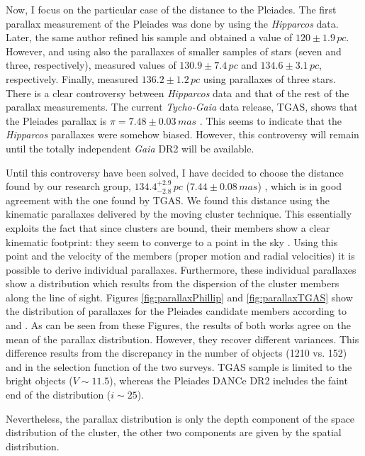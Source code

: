 Now, I focus on the particular case of the distance to the Pleiades. The first parallax measurement of the Pleiades was done by \citet{1999A&A...341L..71V} using the \emph{Hipparcos} data. Later, the same author \citep{2009A&A...497..209V} refined his sample and obtained a value of $120\pm1.9\,pc$. However, \citet{2000ApJ...533..938G} and \citet{2005AJ....129.1616S} using also the parallaxes of smaller samples of stars (seven and three, respectively), measured values of $130.9\pm7.4\,pc$ and $134.6\pm3.1\,pc$, respectively. Finally, \citet{2014Sci...345.1029M} measured $136.2\pm1.2\,pc$ using parallaxes of three stars. There is a clear controversy between \emph{Hipparcos} data and that of the rest of the parallax measurements. The current \emph{Tycho-Gaia} data release, TGAS, shows that the Pleiades parallax is $\pi = 7.48\pm0.03\,mas$ \citep{2017A&A...601A..19G}. This seems to indicate that the \emph{Hipparcos} parallaxes were somehow biased. However, this controversy will remain until the totally independent \emph{Gaia} DR2 will be available.

Until this controversy have been solved, I have decided to choose the distance found by our research group, $134.4^{+2.9}_{-2.8}\,pc$ ($7.44\pm0.08\,mas$) \citep{Galli2017}, which is in good agreement with the one found by TGAS. We found this distance using the kinematic parallaxes delivered by the moving cluster technique. This essentially exploits the fact that since clusters are bound, their members show a clear kinematic footprint: they seem to converge to a point in the sky \citep{1964IAUS...20...50B}. Using this point and the velocity of the members (proper motion and radial velocities) it is possible to derive individual parallaxes. Furthermore, these individual parallaxes show a distribution which results from the dispersion of the cluster members along the line of sight. Figures \ref{fig:parallaxPhillip} and \ref{fig:parallaxTGAS} show the distribution of parallaxes for the Pleiades candidate members according to \citet{Galli2017} and \citet{2017A&A...601A..19G}. As can be seen from these Figures, the results of both works agree on the mean of the parallax distribution. However, they recover different variances. This difference results from the discrepancy in the number of objects (1210 vs. 152) and in the selection function of the two surveys. TGAS sample is limited to the bright objects ($V \sim 11.5 $), whereas the Pleiades DANCe DR2 includes the faint end of the distribution ($i\sim25$).

Nevertheless, the parallax distribution is only the depth component of the space distribution of the cluster, the other two components are given by the spatial distribution. 

